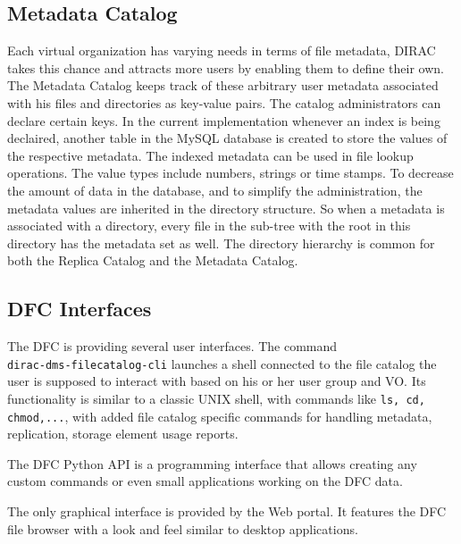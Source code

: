 \subsection{Metadata Catalog}

Each virtual organization has varying needs in terms of file metadata, DIRAC takes this chance and 
attracts more users by enabling them to define their own. The Metadata Catalog keeps track of these 
arbitrary user metadata associated with his files and directories as key-value pairs. 
The catalog administrators can declare certain keys. In the current implementation whenever an 
index is being declaired, another table in the MySQL database is created to store the values of the 
respective metadata. The indexed metadata can be used in file lookup operations. The value types include 
numbers, strings or time stamps. To decrease the amount of data in the database, and to simplify the 
administration, the metadata values are inherited in the directory structure. So when a metadata is 
associated with a directory, every file in the sub-tree with the root in this directory has the metadata
set as well. The directory hierarchy is common for both the Replica Catalog and the Metadata Catalog.

\subsection{DFC Interfaces}

The DFC is providing several user interfaces. The command \\ \texttt{dirac-dms-filecatalog-cli} launches a shell
connected to the file catalog the user is supposed to interact with based on his or her user group and VO. Its 
functionality is similar to a classic UNIX shell, with commands like \texttt{ls, cd, chmod,...}, with added 
file catalog specific commands for handling metadata, replication, storage element usage reports.

The DFC Python API is a programming interface that allows creating any custom commands or even
small applications working on the DFC data.

The only graphical interface is provided by the Web portal. It features the DFC file browser
with a look and feel similar to desktop applications. %
